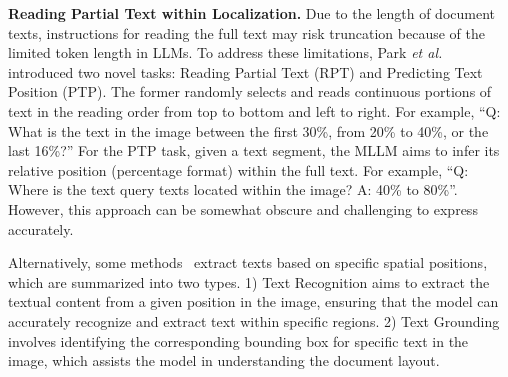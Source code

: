 \noindent \textbf{Reading Partial Text within Localization.} Due to the length of document texts, instructions for reading the full text may risk truncation because of the limited token length in LLMs. To address these limitations, Park \emph{et al.}\cite{park2024hierarchical} introduced two novel tasks: Reading Partial Text (RPT) and Predicting Text Position (PTP). The former randomly selects and reads continuous portions of text in the reading order from top to bottom and left to right. For example, ``Q: What is the text in the image between the first 30\%, from 20\% to 40\%, or the last 16\%?'' For the PTP task, given a text segment, the MLLM aims to infer its relative position (percentage format) within the full text. 
For example, ``Q: Where is the text {query texts} located within the image? A: 40\% to 80\%''.
However, this approach can be somewhat obscure and challenging to express accurately. 

Alternatively, some methods~\cite{hu2024mplug_docowl1.5_arxiv,yu2024texthawk,liu2024hrvda} extract texts based on specific spatial positions, which are summarized into two types.
1) Text Recognition aims to extract the textual content from a given position in the image, ensuring that the model can accurately recognize and extract text within specific regions.
2) Text Grounding involves identifying the corresponding bounding box for specific text in the image, which assists the model in understanding the document layout.



